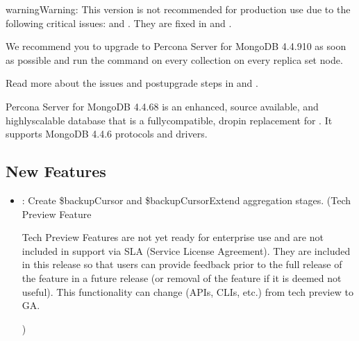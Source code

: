\documentclass[letterpaper,10pt,english]{sphinxmanual}
\begin{document}
\begin{sphinxadmonition}{warning}{Warning:}
\sphinxAtStartPar
This version is not recommended for production use due to the following critical issues:  and . They are fixed in  and {\hyperref[\detokenize{release_notes/4.4.9-10:psmdb-4-4-9-10}]{}}.

\sphinxAtStartPar
We recommend you to upgrade to Percona Server for MongoDB 4.4.9\sphinxhyphen{}10 as soon as possible and run the  command on every collection on every replica set node.

\sphinxAtStartPar
Read more about the issues and post\sphinxhyphen{}upgrade steps in  and .
\end{sphinxadmonition}

\sphinxAtStartPar
Percona Server for MongoDB 4.4.6\sphinxhyphen{}8 is an enhanced, source available, and highly\sphinxhyphen{}scalable database that is a
fully\sphinxhyphen{}compatible, drop\sphinxhyphen{}in replacement for .
It supports MongoDB 4.4.6 protocols and drivers.


\subsection{New Features}
\label{\detokenize{release_notes/4.4.6-8:new-features}}\begin{itemize}
\item {} 
\sphinxAtStartPar
{}: Create \$backupCursor and \$backupCursorExtend aggregation stages. (Tech Preview Feature %
\begin{footnote}[1]\sphinxAtStartFootnote
Tech Preview Features are not yet ready for enterprise use and are not included in support via SLA (Service License Agreement). They are included in this release so that users can provide feedback prior to the full release of the feature in a future release (or removal of the feature if it is deemed not useful). This functionality can change (APIs, CLIs, etc.) from tech preview to GA.
%
\end{footnote})

\end{itemize}
\end{document}
